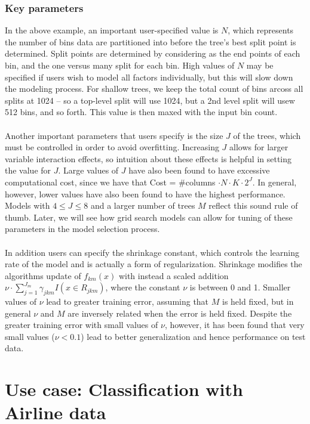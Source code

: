 \documentclass[11pt]{article}
\begin{document}
\subsubsection{Key parameters}

In the above example, an important user-specified value is $N$, which represents the number of bins data are partitioned into before the tree's best split point is determined. Split points are determined by considering as the end points of each bin, and the one versus many split for each bin. High values of $N$ may be specified if users wish to model all factors individually, but this will slow down the modeling process. For shallow trees, we keep the total count of bins arcoss all splits at 1024 -- so a top-level split will use 1024, but a 2nd level split will usew 512 bins, and so forth. This value is then maxed with the input bin count.
\\
\\
Another important parameters that users specify is the size $J$ of the trees, which must be controlled in order to avoid overfitting. Increasing $J$ allows for larger variable interaction effects, so intuition about these effects is helpful in setting the value for $J$. Large values of $J$ have also been found to have excessive computational cost, since we have that Cost = \#columns $\cdot N \cdot K \cdot 2^{J}$. In general, however, lower values have also been found to have the highest performance. Models with $4 \leq J \leq 8$ and a larger number of trees $M$ reflect this sound rule of thumb. Later, we will see how grid search models can allow for tuning of these parameters in the model selection process.
\\
\\
In addition users can specify the shrinkage constant, which controls the learning rate of the model and is actually a form of regularization. Shrinkage modifies the algorithms update of $f_{km}(x)$ with instead a scaled addition $\nu \cdot \sum_{j=1}^{J_m} \gamma_{jkm} I(x \in R_{jkm})$, where the constant $\nu$ is between 0 and 1. Smaller values of $\nu$ lead to greater training error, assuming that $M$ is held fixed, but in general $\nu$ and $M$ are inversely related when the error is held fixed.
Despite the greater training error with small values of $\nu$, however, it has been found that very small values ($\nu < 0.1$) lead to better generalization and hence performance on test data. 

\section{Use case: Classification with Airline data} \label{3}
\end{document}
